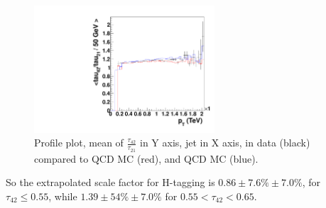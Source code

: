 \begin{figure}[htb]
\begin{center}
\includegraphics[width=0.6\textwidth,angle=0]{figs/SFExtra/tau4221PtProfile.pdf}
\end{center}
\caption{
Profile plot, mean of $\frac{\tau_{42}}{\tau_{21}}$ in Y axis, 
jet \pt in X axis, in data (black) compared to \PYTHIA QCD MC (red), and
\HERWIG QCD MC (blue).
}
\label{fig:tau42212DPtProfile}
\end{figure}


So the extrapolated scale factor for H-tagging is $0.86 \pm 7.6\% \pm 7.0\%$, 
for $\tau_{42} \leq  0.55$, while $1.39 \pm 54\% \pm 7.0\%$ for 
$0.55 < \tau_{42} <  0.65$.   


\clearpage


